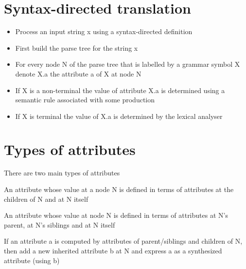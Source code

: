 \documentclass{article}[18pt]
\begin{document}
\section{Syntax-directed translation}
\begin{definition}
\begin{itemize}
	\item Process an input string x using a syntax-directed definition
	\item First build the parse tree for the string x
	\item For every node N of the parse tree that is labelled by a grammar symbol X denote X.a the attribute a of X at node N
	\item If X is a non-terminal the value of attribute X.a is determined using a semantic rule associated with some production
	\item If X is terminal the value of X.a is determined by the lexical analyser
\end{itemize}
\end{definition}
\section{Types of attributes}
There are two main types of attributes
\begin{definition}
An attribute whose value at a node N is defined in terms of attributes at the children of N and at N itself
\end{definition}
\begin{definition}
An attribute whose value at node N is defined in terms of attributes at N's parent, at N's siblings and at N itself
\end{definition}
If an attribute a is computed by attributes of parent/siblings and children of N, then add a new inherited attribute b at N and express a as a synthesized attribute (using b)
\end{document}
